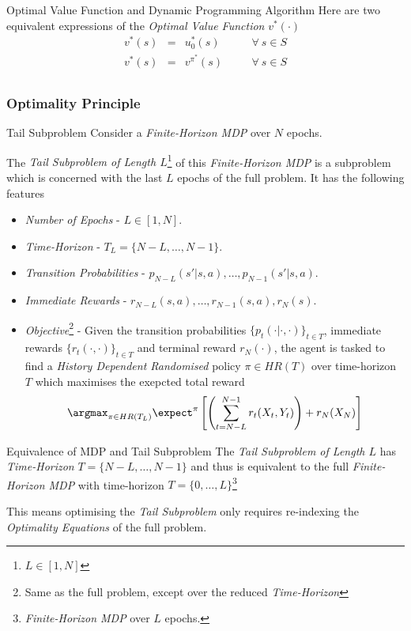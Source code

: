 \documentclass[11pt,a4paper]{article}
\begin{document}
  \begin{theorem}{Optimal Value Function and Dynamic Programming Algorithm}
    Here are two equivalent expressions of the \textit{Optimal Value Function} $v^*(\cdot)$
    \[\begin{array}{rclll}
      v^*(s)&=&u_0^*(s)&\quad&\forall\ s\in S\\
      v^*(s)&=&v^{\pi^*}(s)&\quad&\forall\ s\in S\\
    \end{array}\]
  \end{theorem}

\subsubsection{Optimality Principle}

  \begin{definition}{Tail Subproblem}
    Consider a \textit{Finite-Horizon MDP} over $N$ epochs.
    \par The \textit{Tail Subproblem of Length $L$}\footnote{$L\in[1,N]$} of this \textit{Finite-Horizon MDP} is a subproblem which is concerned with the last $L$ epochs of the full problem. It has the following features
    \begin{itemize}
      \item \textit{Number of Epochs} - $L\in[1,N]$.
      \item \textit{Time-Horizon} - $T_L=\{N-L,\dots,N-1\}$.
      \item \textit{Transition Probabilities} - $p_{N-L}(s'|s,a),\dots,p_{N-1}(s'|s,a)$.
      \item \textit{Immediate Rewards} - $r_{N-L}(s,a),\dots,r_{N-1}(s,a),r_N(s)$.
      \item \textit{Objective}\footnote{Same as the full problem, except over the reduced \textit{Time-Horizon}} - Given the transition probabilities $\{p_t(\cdot|\cdot,\cdot)\}_{t\in T}$, immediate rewards $\{r_t(\cdot,\cdot)\}_{t\in T}$ and terminal reward $r_N(\cdot)$, the agent is tasked to find a \textit{History Dependent Randomised} policy $\pi\in HR(T)$ over time-horizon $T$ which maximises the exepcted total reward
      \[ \argmax_{\pi\in HR(T_L)}\expect^\pi\left[\left(\sum_{t=N-L}^{N-1}r_t(X_t,Y_t)\right)+r_N(X_N)\right] \]
    \end{itemize}
  \end{definition}

  \begin{remark}{Equivalence of MDP and Tail Subproblem}
    The \textit{Tail Subproblem of Length $L$} has \textit{Time-Horizon} $T=\{N-L,\dots,N-1\}$ and thus is equivalent to the full \textit{Finite-Horizon MDP} with time-horizon $T=\{0,\dots,L\}$\footnote{\textit{Finite-Horizon MDP} over $L$ epochs.}
    \par This means optimising the \textit{Tail Subproblem} only requires re-indexing the \textit{Optimality Equations} of the full problem.
  \end{remark}
\end{document}

